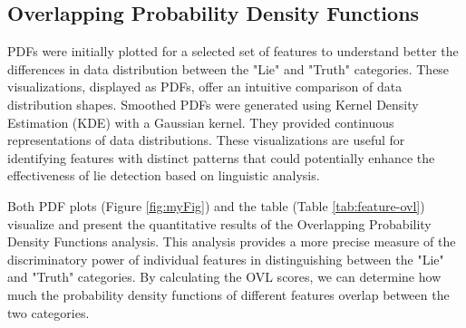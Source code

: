 \documentclass[12pt]{article}
\begin{document}
\subsection{Overlapping Probability Density Functions }
PDFs were initially plotted for a selected set of features to understand better the differences in data distribution between the "Lie" and "Truth" categories. These visualizations, displayed as PDFs, offer an intuitive comparison of data distribution shapes. Smoothed PDFs were generated using Kernel Density Estimation (KDE) with a Gaussian kernel. They provided continuous representations of data distributions. These visualizations are useful for identifying features with distinct patterns that could potentially enhance the effectiveness of lie detection based on linguistic analysis.
  
Both PDF plots (Figure \ref{fig:myFig}) and the table (Table \ref{tab:feature-ovl}) visualize and present the quantitative results of the Overlapping Probability Density Functions analysis. This analysis provides a more precise measure of the discriminatory power of individual features in distinguishing between the "Lie" and "Truth" categories. By calculating the OVL scores, we can determine how much the probability density functions of different features overlap between the two categories. 
\end{document}
